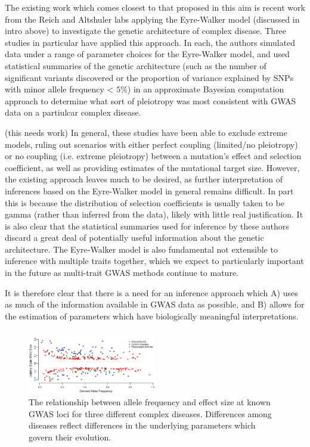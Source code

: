 \documentclass[11pt]{article}
\newcommand{\jb}[1]{{\color{blue} (#1)} }
\begin{document}
The existing work which comes closest to that proposed in this aim is recent work from the Reich and Altshuler labs applying the Eyre-Walker model (discussed in intro above) to investigate the genetic architecture of complex disease. Three studies in particular have applied this approach\cite{Agarwala:2013bu, Fuchsberger:2016df,Mancuso:2015cp}. In each, the authors simulated data under a range of parameter choices for the Eyre-Walker model, and used statistical summaries of the genetic architecture (such as the number of significant variants discovered or the proportion of variance explained by SNPs with minor allele frequency < $5\%$) in an approximate Bayesian computation approach to determine what sort of pleiotropy was most consistent with GWAS data on a partiulcar complex disease.

\jb{this needs work}
In general, these studies have been able to exclude extreme models, ruling out scenarios with either perfect coupling (limited/no pleiotropy) or no coupling (i.e. extreme pleiotropy) between a mutation's effect and selection coefficient, as well as providing estimates of the mutational target size. However, the existing approach leaves much to be desired, as further interpretation of inferences based on the Eyre-Walker model in general remains difficult. In part this is because the distribution of selection coefficients is usually taken to be gamma (rather than inferred from the data), likely with little real justification\cite{EyreWalker:2007dl,Racimo:2014cb}. It is also clear that the statistical summaries used for inference by these authors discard a great deal of potentially useful information about the genetic architecture. The Eyre-Walker model is also fundamental not extensible to inference with multiple traits together, which we expect to particularly important in the future as multi-trait GWAS methods continue to mature.\cite{PickrellPairwise,SomeMatthewStephensPaper}

It is therefore clear that there is a need for an inference approach which A) uses as much of the information available in GWAS data as possible, and B) allows for the estimation of parameters which have biologically meaningful interpretations. 


\begin{figure}
    \includegraphics[width=0.5\textwidth]{../figures/JointSpecFig.pdf}
   \caption{The relationship between allele frequency and effect size at known GWAS loci for three different complex diseases. Differences among diseases reflect differences in the underlying parameters which govern their evolution.}
   \label{joint-freq-effect-dist}
  \end{figure}
\end{document}

